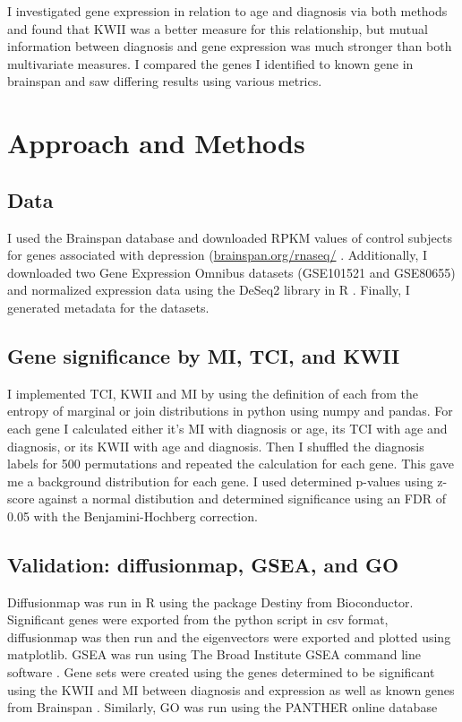 \documentclass{bioinfo}
\begin{document}
I investigated gene expression in relation to age and diagnosis via both methods and found that KWII was a better measure for this relationship, but mutual information between diagnosis and gene expression was much stronger than both multivariate measures.  I compared the genes I identified to known gene in brainspan and saw differing results using various metrics.

\section{Approach and Methods}

\subsection{Data}
I used the Brainspan database and downloaded RPKM values of control subjects for genes associated with depression (\href{http://www.brainspan.org/rnaseq/}{brainspan.org/rnaseq/} \citep{Brainspan}.  Additionally, I downloaded two Gene Expression Omnibus datasets (GSE101521 and GSE80655) and normalized
expression data using the DeSeq2 library in R \citep{Love}.  Finally, I generated metadata for the datasets.

\subsection{Gene significance by MI, TCI, and KWII}
I implemented TCI, KWII and MI by using the definition of each from the entropy of marginal or join distributions in python using numpy and pandas.  For each gene I calculated either it's MI with diagnosis or age, its TCI with age and diagnosis, or its KWII with age and diagnosis.  Then I shuffled the diagnosis labels for 500 permutations and repeated the calculation for each gene.  This gave me a background distribution for each gene.  I used determined p-values using z-score against a normal
distibution and determined significance using an FDR of 0.05 with the Benjamini-Hochberg correction.

\subsection{Validation: diffusionmap, GSEA, and GO}
Diffusionmap was run in R using the package Destiny from Bioconductor.  Significant genes were exported from the python script in csv format, diffusionmap was then run and the eigenvectors were exported and plotted using matplotlib.  GSEA was run using The Broad Institute GSEA command line software \citep{Subramanian}.  Gene sets were created using the genes determined to be significant using the KWII and MI between diagnosis and expression as well as known genes from Brainspan
\citep{Brainspan}.  Similarly, GO was run using the PANTHER online database \citep{GO}
\end{document}
